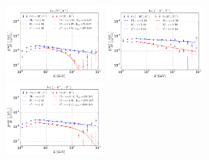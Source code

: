 \begin{figure}[h!]
\includegraphics[width=0.33\textwidth]{plots/SED_boxes_source_4cutoff.pdf}
\includegraphics[width=0.33\textwidth]{plots/SED_boxes_source_0.pdf}
\includegraphics[width=0.33\textwidth]{plots/SED_boxes_source_-4cutoff.pdf}

\end{figure}
